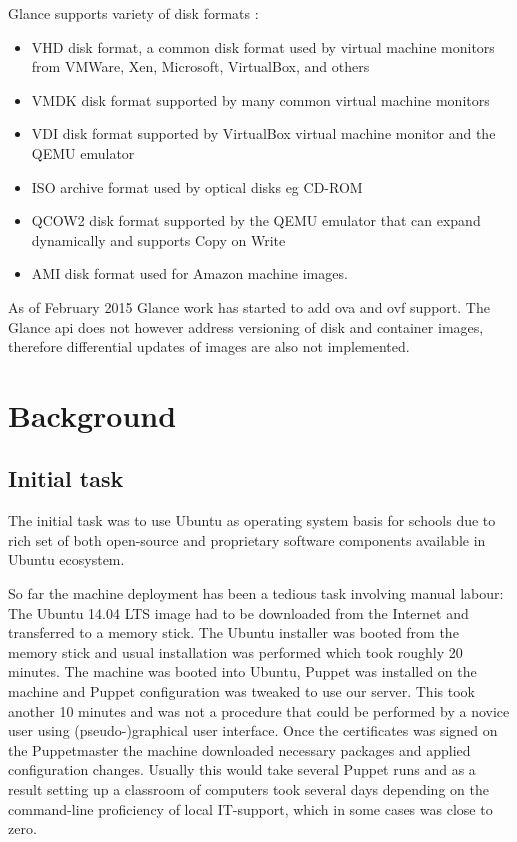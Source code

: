 \documentclass[a4paper,11pt]{kth-mag}
\begin{document}
Glance supports variety of disk formats \cite{glance-formats}:

\begin{itemize}
\item VHD disk format, a common disk format used by virtual machine monitors from VMWare, Xen, Microsoft, VirtualBox, and others
\item VMDK disk format supported by many common virtual machine monitors
\item VDI disk format supported by VirtualBox virtual machine monitor and the QEMU emulator
\item ISO archive format used by optical disks eg CD-ROM
\item QCOW2 disk format supported by the QEMU emulator that can expand dynamically and supports Copy on Write
\item AMI disk format used for Amazon machine images.
\end{itemize}

\noindent

As of February 2015 Glance work has started to add
\acrfull{ova} and \acrfull{ovf}
\cite{ovas-and-ovfs-what-are-they-and-whats-the-difference}
support.
The Glance \acrshort{api} does not however address versioning
of disk and container images, therefore differential
updates of images are also not implemented.

%
%
%
%
\chapter{Background}
\label{chap:bgr}


\section{Initial task}

The initial task was to use Ubuntu as operating system basis
for schools due to rich set of both open-source and
proprietary software components available in Ubuntu ecosystem.

So far the machine deployment has been a tedious task involving
manual labour:
The Ubuntu 14.04 LTS image had to be downloaded from the Internet
and transferred to a memory stick.
The Ubuntu installer was booted from the memory stick
and usual installation was performed which took roughly 20 minutes.
The machine was booted into Ubuntu,
Puppet was installed on the machine and Puppet configuration
was tweaked to use our server.
This took another 10 minutes and was not a procedure that could
be performed by a novice user using (pseudo-)graphical user interface.
Once the certificates was signed on the Puppetmaster the
machine downloaded necessary packages and applied configuration
changes.
Usually this would take several Puppet runs and as a result
setting up a classroom of computers took several days
depending on the command-line proficiency of local
IT-support, which in some cases was close to zero.
\end{document}
